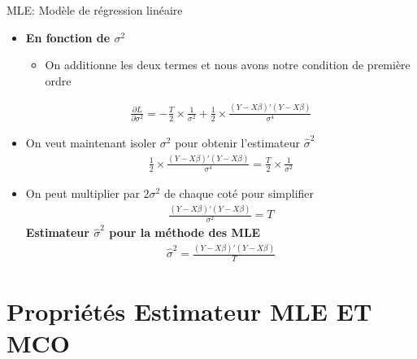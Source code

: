 \documentclass{beamer}
\begin{document}
\begin{frame}{MLE: Modèle de régression linéaire}
\begin{itemize}
\item \textbf{En fonction de $\sigma^2$}
\begin{itemize}
\item On additionne les deux termes et nous avons notre condition de première ordre
\end{itemize}
\begin{align*}
\frac{\partial L}{\partial \sigma^2}= -\frac{T}{2} \times \frac{1}{\sigma^2}+ \frac{1}{2} \times \frac{(Y-X\beta)'(Y-X \beta)}{\sigma^4}
\end{align*}
\item On veut maintenant isoler $\sigma^2$ pour obtenir l'estimateur $\hat{\sigma}^2$
\begin{align*}
\frac{1}{2} \times \frac{(Y-X\beta)'(Y-X \beta)}{\sigma^4}=\frac{T}{2} \times \frac{1}{\sigma^2}
\end{align*}
\item On peut multiplier par $2 \sigma^2$ de chaque coté pour simplifier
\begin{align*}
\frac{(Y-X\beta)'(Y-X \beta)}{\sigma^2}=T
\end{align*}
\textbf{Estimateur $\hat{\sigma}^2$ pour la méthode des MLE}
\begin{align*}
\hat{\sigma}^2=\frac{(Y-X \beta)'(Y-X \beta)}{T}
\end{align*}
\end{itemize}
\end{frame}


\section{Propriétés Estimateur MLE ET MCO}

\frame{\tableofcontents[current]}
\end{document}
